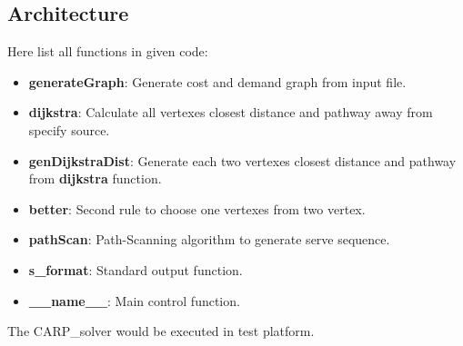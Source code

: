 \documentclass[conference,compsoc]{IEEEtran}
\begin{document}
\subsection{Architecture}
Here list all functions in given code:
\begin{itemize}
    \item \textbf{generateGraph}: Generate cost and demand graph from input file.
    \item \textbf{dijkstra}: Calculate all vertexes closest distance and
    pathway away from specify source.
    \item \textbf{genDijkstraDist}: Generate each two vertexes closest distance
    and pathway from \textbf{dijkstra} function.
    \item \textbf{better}: Second rule to choose one vertexes from two vertex. 
    \item \textbf{pathScan}: Path-Scanning algorithm to generate serve sequence. 
    \item \textbf{s\_format}: Standard output function. 
    \item \textbf{\_\_name\_\_}: Main control function. 
\end{itemize}
The CARP\_solver would be executed in test platform.
\end{document}

